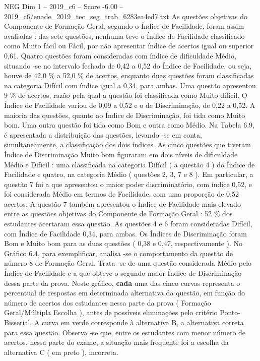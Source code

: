 \begin{textsample}{NEG Dim 1 – 2019\_c6 – Score -6.00 – 2019\_c6/enade\_2019\_tec\_seg\_trab\_6283ea4ed7.txt}
As questões objetivas do Componente de Formação Geral, segundo o Índice de Facilidade, foram assim avaliadas : das sete questões, nenhuma teve o Índice de Facilidade classificado como Muito fácil ou Fácil, por não apresentar índice de acertos igual ou superior 0,61.
Quatro questões foram consideradas com índice de dificuldade Médio, situando -se no intervalo fechado de 0,42 a 0,52 do Índice de Facilidade, ou seja, houve de 42,0 \% a 52,0 \% de acertos, enquanto duas questões foram classificadas na categoria Difícil com índice igual a 0,34, para ambas.
Uma questão apresentou 9 \% de acertos, razão pela qual a questão foi classificada como Muito difícil.
O Índice de Facilidade variou de 0,09 a 0,52 e o de Discriminação, de 0,22 a 0,52.
A maioria das questões, quanto ao Índice de Discriminação, foi tida como Muito bom.
Uma outra questão foi tida como Bom e outra como Médio.
Na Tabela 6.9, é apresentada a distribuição das questões, levando -se em conta, simultaneamente, a classificação dos dois índices.
As cinco questões que tiveram Índice de Discriminação Muito bom figuraram em dois níveis de dificuldade Médio e Difícil : uma classificada na categoria Difícil ( a questão 4 ) do Índice de Facilidade e quatro, na categoria Médio ( questões 2, 3, 7 e 8 ).
Em particular, a questão 7 foi a que apresentou o maior poder discriminatório, com índice 0,52, e foi considerada Médio em termos de Facilidade, com uma proporção de 0,52 acertos.
A questão 7 também apresentou o Índice de Facilidade mais elevado entre as questões objetivas do Componente de Formação Geral : 52 \% dos estudantes acertaram essa questão.
As questões 4 e 6 foram consideradas Difícil, com Índice de Facilidade 0,34, para ambas.
Os Índices de Discriminação foram Bom e Muito bom para as duas questões ( 0,38 e 0,47, respectivamente ).
No Gráfico 6.4, para exemplificar, analisa -se o comportamento da questão de número 8 de Formação Geral.
Trata -se de uma questão considerada Médio pelo Índice de Facilidade e a que obteve o segundo maior Índice de Discriminação dessa parte da prova.
Neste gráfico, \textbf{cada} uma das cinco curvas representa o percentual de respostas em determinada alternativa da questão, em função do número de acertos dos estudantes nessa parte da prova ( Formação Geral/Múltipla Escolha ), antes de possíveis eliminações pelo critério Ponto-Bisserial.
A curva em verde corresponde à alternativa B, a alternativa correta para essa questão.
Observa -se que, entre os estudantes com menor número de acertos, nessa parte do exame, a situação mais frequente foi a escolha da alternativa C ( em preto ), incorreta.

\end{textsample}

